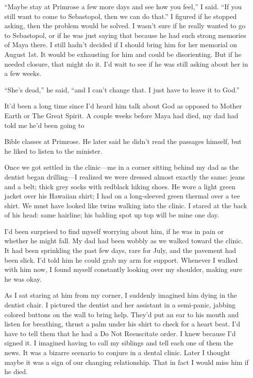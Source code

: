 \documentclass[12pt]{book}
\begin{document}
``Maybe stay at Primrose a few more days and see how you feel,'' I said. ``If you still want to come to Sebastopol, then we can do that.'' I figured if he stopped asking, then the problem would be solved. I wasn't sure if he really wanted to go to Sebastopol, or if he was just saying that because he had such strong memories of Maya there. I still hadn't decided if I should bring him for her memorial on August 1st. It would be exhausting for him and could be disorienting. But if he needed closure, that might do it. I'd wait to see if he was still asking about her in a few weeks.

``She's dead,'' he said, ``and I can't change that. I just have to leave it to God.''

It'd been a long time since I'd heard him talk about God as opposed to Mother Earth or The Great Spirit. A couple weeks before Maya had died, my dad had told me he'd been going to

Bible classes at Primrose. He later said he didn't read the passages himself, but he liked to listen to the minister.

Once we got settled in the clinic---me in a corner sitting behind my dad as the dentist began drilling---I realized we were dressed almost exactly the same: jeans and a belt; thick grey socks with red\/black hiking shoes. He wore a light green jacket over his Hawaiian shirt; I had on a long-sleeved green thermal over a tee shirt. We must have looked like twins walking into the clinic. I stared at the back of his head: same hairline; his balding spot up top will be mine one day.

I'd been surprised to find myself worrying about him, if he was in pain or whether he might fall. My dad had been wobbly as we walked toward the clinic. It had been sprinkling the past few days, rare for July, and the pavement had been slick. I'd told him he could grab my arm for support. Whenever I walked with him now, I found myself constantly looking over my shoulder, making sure he was okay.

As I sat staring at him from my corner, I suddenly imagined him dying in the dentist chair. I pictured the dentist and her assistant in a semi-panic, jabbing colored buttons on the wall to bring help. They'd put an ear to his mouth and listen for breathing, thrust a palm under his shirt to check for a heart beat. I'd have to tell them that he had a Do Not Resuscitate order. I knew because I'd signed it. I imagined having to call my siblings and tell each one of them the news. It was a bizarre scenario to conjure in a dental clinic. Later I thought maybe it was a sign of our changing relationship. That in fact I would miss him if he died.
\end{document}
